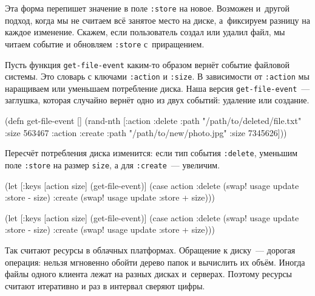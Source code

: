Эта форма перепишет значение в поле \verb|:store| на новое. Возможен и~другой
подход, когда мы не считаем всё занятое место на диске, а~фиксируем разницу на
каждое изменение. Скажем, если пользователь создал или удалил файл, мы читаем
событие и обновляем \verb|:store| с~приращением.

Пусть функция \verb|get-file-event| каким-то образом вернёт событие файловой
системы. Это словарь с ключами \verb|:action| и \verb|:size|. В зависимости от
\verb|:action| мы наращиваем или уменьшаем потребление диска. Наша версия
\texttt{get-file-event}~--- заглушка, которая случайно вернёт одно из двух
событий: удаление или создание.

\begin{english}
  \begin{clojure}
(defn get-file-event []
  (rand-nth
   [{:action :delete
     :path "/path/to/deleted/file.txt"
     :size 563467}
    {:action :create
     :path "/path/to/new/photo.jpg"
     :size 7345626}]))
  \end{clojure}
\end{english}

Пересчёт потребления диска изменится: если тип события \verb|:delete|, уменьшим
поле \verb|:store| на размер \verb|size|, а для \verb|:create|~--- увеличим.

\ifnarrow

\begin{english}
  \begin{clojure}
(let [{:keys [action size]}
      (get-file-event)]
  (case action
    :delete
    (swap! usage update :store - size)
    :create
    (swap! usage update :store + size)))
  \end{clojure}
\end{english}

\else

\begin{english}
  \begin{clojure}
(let [{:keys [action size]} (get-file-event)]
  (case action
    :delete
    (swap! usage update :store - size)
    :create
    (swap! usage update :store + size)))
  \end{clojure}
\end{english}

\fi


Так считают ресурсы в облачных платформах. Обращение к диску~--- дорогая
операция: нельзя мгновенно обойти дерево папок и вычислить их объём. Иногда
файлы одного клиента лежат на разных дисках и~серверах. Поэтому ресурсы считают
итеративно и раз в интервал сверяют цифры.

